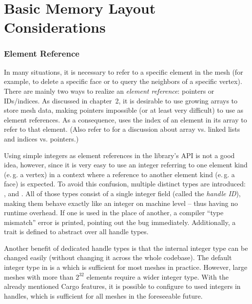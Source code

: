 \section{Basic Memory Layout Considerations}
\label{chap:memory-layout}

\subsubsection*{Element Reference}

In many situations, it is necessary to refer to a specific element in the mesh (for example, to delete a specific face or to query the neighbors of a specific vertex).
There are mainly two ways to realize an \emph{element reference}: pointers or IDs/indices.
As discussed in chapter~2, it is desirable to use growing arrays to store mesh data, making pointers impossible (or at least very difficult) to use as element references.
As a consequence,  uses the index of an element in its array to refer to that element.
(Also refer to \cite{sieger2011design} for a discussion about array vs. linked lists and indices vs. pointers.)

Using simple integers as element references in the library's API is not a good idea, however, since it is very easy to use an integer referring to one element kind (e.\,g. a vertex) in a context where a reference to another element kind (e.\,g. a face) is expected.
To avoid this confusion, multiple distinct types are introduced: ,  and .
All of those types consist of a single integer field (called the \emph{handle ID}), making them behave exactly like an integer on machine level -- thus having no runtime overhead.
If one is used in the place of another, a compiler \enquote{type mismatch} error is printed, pointing out the bug immediately.
Additionally, a  trait is defined to abstract over all handle types.

Another benefit of dedicated handle types is that the internal integer type can be changed easily (without changing it across the whole codebase).
The default integer type in  is a  which is sufficient for most meshes in practice.
However, large meshes with more than $2^{32}$ elements require a wider integer type.
With the already mentioned Cargo features, it is possible to configure  to used  integers in handles, which is sufficient for all meshes in the foreseeable future.


